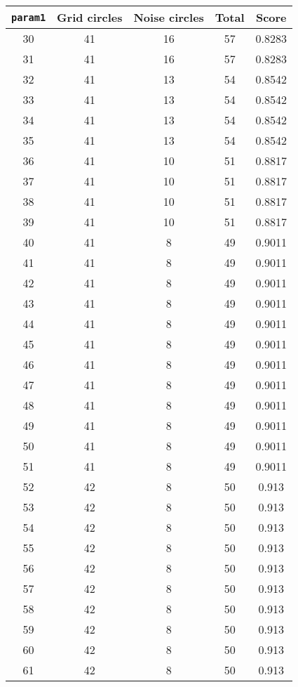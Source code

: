 \documentclass[letterpaper, 12pt]{article}
\begin{document}
\begin{longtable}{|c|c|c|c|c|}
\hline
\textbf{\texttt{param1}} & \textbf{Grid circles} & \textbf{Noise circles} & \textbf{Total} & \textbf{Score} \\
\hline
30 & 41 & 16 & 57 & 0.8283 \\
\hline
31 & 41 & 16 & 57 & 0.8283 \\
\hline
32 & 41 & 13 & 54 & 0.8542 \\
\hline
33 & 41 & 13 & 54 & 0.8542 \\
\hline
34 & 41 & 13 & 54 & 0.8542 \\
\hline
35 & 41 & 13 & 54 & 0.8542 \\
\hline
36 & 41 & 10 & 51 & 0.8817 \\
\hline
37 & 41 & 10 & 51 & 0.8817 \\
\hline
38 & 41 & 10 & 51 & 0.8817 \\
\hline
39 & 41 & 10 & 51 & 0.8817 \\
\hline
40 & 41 & 8 & 49 & 0.9011 \\
\hline
41 & 41 & 8 & 49 & 0.9011 \\
\hline
42 & 41 & 8 & 49 & 0.9011 \\
\hline
43 & 41 & 8 & 49 & 0.9011 \\
\hline
44 & 41 & 8 & 49 & 0.9011 \\
\hline
45 & 41 & 8 & 49 & 0.9011 \\
\hline
46 & 41 & 8 & 49 & 0.9011 \\
\hline
47 & 41 & 8 & 49 & 0.9011 \\
\hline
48 & 41 & 8 & 49 & 0.9011 \\
\hline
49 & 41 & 8 & 49 & 0.9011 \\
\hline
50 & 41 & 8 & 49 & 0.9011 \\
\hline
51 & 41 & 8 & 49 & 0.9011 \\
\hline
52 & 42 & 8 & 50 & 0.913 \\
\hline
53 & 42 & 8 & 50 & 0.913 \\
\hline
54 & 42 & 8 & 50 & 0.913 \\
\hline
55 & 42 & 8 & 50 & 0.913 \\
\hline
56 & 42 & 8 & 50 & 0.913 \\
\hline
57 & 42 & 8 & 50 & 0.913 \\
\hline
58 & 42 & 8 & 50 & 0.913 \\
\hline
59 & 42 & 8 & 50 & 0.913 \\
\hline
60 & 42 & 8 & 50 & 0.913 \\
\hline
61 & 42 & 8 & 50 & 0.913 \\

\end{longtable}
\end{document}
